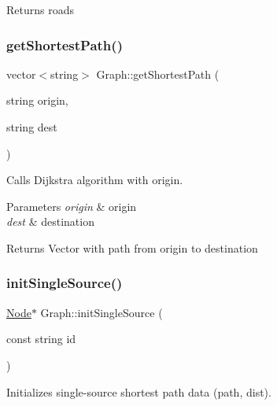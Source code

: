 \begin{DoxyReturn}{Returns}
roads 
\end{DoxyReturn}
\mbox{\label{class_graph_a437976400df5ab50b20703be4f88e6e7}} 
\subsubsection{\texorpdfstring{get\+Shortest\+Path()}{getShortestPath()}}
{\footnotesize\ttfamily vector$<$string$>$ Graph\+::get\+Shortest\+Path (\begin{DoxyParamCaption}\item[{string}]{origin,  }\item[{string}]{dest }\end{DoxyParamCaption})\hspace{0.3cm}{\ttfamily [inline]}}



Calls Dijkstra algorithm with origin. 


\begin{DoxyParams}{Parameters}
{\em origin} & origin \\
\hline
{\em dest} & destination \\
\hline
\end{DoxyParams}
\begin{DoxyReturn}{Returns}
Vector with path from origin to destination 
\end{DoxyReturn}
\mbox{\label{class_graph_a94386342ca91dcb2022745eb289dbc16}} 
\subsubsection{\texorpdfstring{init\+Single\+Source()}{initSingleSource()}}
{\footnotesize\ttfamily \mbox{\hyperlink{class_node}{Node}}$\ast$ Graph\+::init\+Single\+Source (\begin{DoxyParamCaption}\item[{const string}]{id }\end{DoxyParamCaption})\hspace{0.3cm}{\ttfamily [inline]}}



Initializes single-\/source shortest path data (path, dist). 

